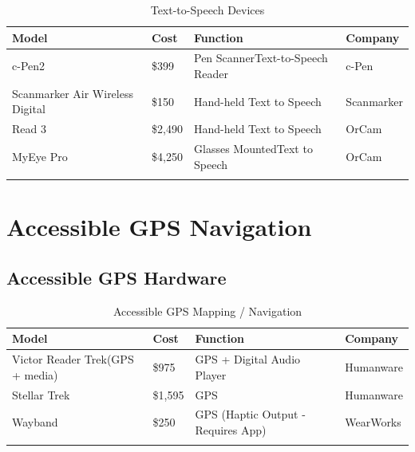 \documentclass[14pt, letterpaper,twoside]{extreport}
\begin{document}
\begin{longtable}[]{@{}
	>{\raggedright\arraybackslash}p{}
	>{\raggedright\arraybackslash}p{}
	>{\raggedright\arraybackslash}p{}
	>{\raggedright\arraybackslash}p{}@{}
	}
	\toprule\noalign{}

	\textbf{Model}                  & \textbf{Cost} & \textbf{Function}                       & \textbf{Company} \\
	\midrule\noalign{}
	\endhead
	\bottomrule\noalign{}
	\endlastfoot
	c-Pen2                          & \$399         & Pen Scanner\break Text-to-Speech Reader & c-Pen            \\[1.5em]
	Scanmarker Air Wireless Digital & \$150         & Hand-held Text to Speech                & Scanmarker       \\[1.5em]
	Read 3                          & \$2,490       & Hand-held Text to Speech                & OrCam            \\[1.5em]
	MyEye Pro                       & \$4,250       & Glasses Mounted\break Text to Speech    & OrCam            \\[1.5em]\hline
	\caption{ Text-to-Speech Devices}
\end{longtable}


\hypertarget{accessible-gps-mapping}{%
	\pagebreak \chapter*{Accessible GPS Navigation}\label{accessible-gps-mapping}}

\hypertarget{accessible-gps-mapping-hardware}{%
	\section*{Accessible GPS Hardware}\label{accessible-gps-mapping-hardware}}

\begin{longtable}[]{@{}
	>{\raggedright\arraybackslash}p{}
	>{\raggedright\arraybackslash}p{}
	>{\raggedright\arraybackslash}p{}
	>{\raggedright\arraybackslash}p{}@{}
	}
	\toprule\noalign{}

	\textbf{Model}                  & \textbf{Cost} & \textbf{Function}                  & \textbf{Company} \\
	\midrule\noalign{}
	\endhead
	\bottomrule\noalign{}
	\endlastfoot
	Victor Reader Trek(GPS + media) & \$975         & GPS + Digital Audio Player         & Humanware        \\[1.5em]
	Stellar Trek                    & \$1,595       & GPS                                & Humanware        \\[1.5em]
	Wayband                         & \$250         & GPS (Haptic Output - Requires App) & WearWorks         \\[1.5em]\hline
	\caption{ Accessible GPS Mapping / Navigation }
\end{longtable}
\end{document}
